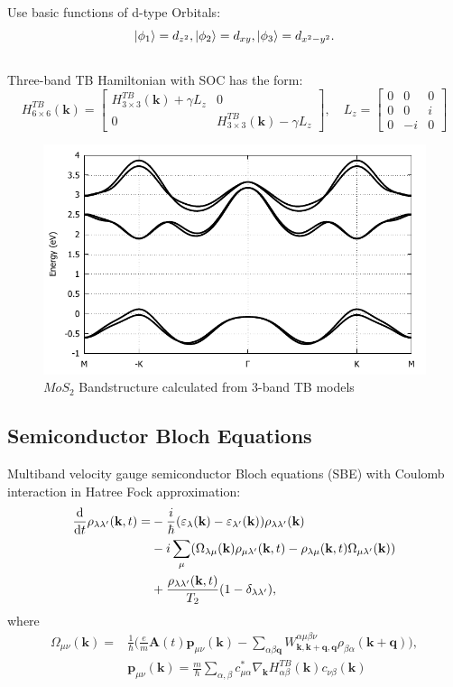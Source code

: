 \documentclass{beamer}
\begin{document}
	\begin{frame}
Use basic functions of d-type Orbitals: $$\ket{\phi_1} = d_{z^2}, \ket{\phi_2} = d_{xy}, \ket{\phi_3} = d_{x^2- y^2}.$$\\Three-band TB Hamiltonian with SOC has the form:
		\begin{equation}
			H^{TB}_{6\times 6}(\textbf{k}) = \begin{bmatrix}
				H^{TB}_{3\times 3}(\textbf{k}) + \gamma L_z & 0\\ 0& H^{TB}_{3\times 3}(\textbf{k}) - \gamma L_z
			\end{bmatrix}, \quad L_z= \begin{bmatrix}
			0 & 0 & 0\\
			0 & 0 & i\\
			0 & -i& 0
			\end{bmatrix}
		\end{equation}
		\begin{figure}			
			\includegraphics[width=0.5\linewidth]{images/BS.pdf}
			\caption{$MoS_2$ Bandstructure calculated from 3-band TB models\cite{liu_three-band_2013}}
		\end{figure}
	\end{frame}
	\subsection{Semiconductor Bloch Equations}
	\begin{frame}
	Multiband velocity gauge semiconductor Bloch equations (SBE) with Coulomb interaction in Hatree Fock approximation:
	\begin{align}
		\dv{ }{t}\rho_{\lambda \lambda'} (\textbf{k},t) = &-\frac{i}{\hbar} (\varepsilon_{\lambda}(\textbf{k}) -\varepsilon_{\lambda'}(\textbf{k}))\rho_{\lambda \lambda'} (\textbf{k})\nonumber\\
		& -i \sum_{\mu} (\Omega_{\lambda \mu}(\textbf{k})\rho_{\mu \lambda'}(\textbf{k},t) -\rho_{\lambda \mu}(\textbf{k},t)\Omega_{\mu \lambda'}(\textbf{k}))\\
		& + \frac{\rho_{\lambda \lambda'}(\textbf{k},t)}{T_2}(1-\delta_{\lambda\lambda'}),\nonumber
	\end{align}
	where
	\begin{align}
		\Omega_{\mu \nu}(\textbf{k}) = &\frac{1}{\hbar} \bigg(\frac{e}{m}\textbf{A}(t)\textbf{p}_{\mu \nu}(\textbf{k}) - \sum_{\alpha \beta \textbf{q}} W^{\alpha \mu \beta\nu}_{\textbf{k},\textbf{k}+\textbf{q},\textbf{q}}\rho_{\beta\alpha}(\textbf{k}+\textbf{q})\bigg),\\
		&\textbf{p}_{\mu\nu}(\textbf{k}) = \frac{m}{\hbar}\sum_{\alpha,\beta} c^*_{\mu\alpha}\nabla_{\textbf{k}}H^{TB}_{\alpha\beta}(\textbf{k})c_{\nu\beta}(\textbf{k})
	\end{align}
	\end{frame}
\end{document}
